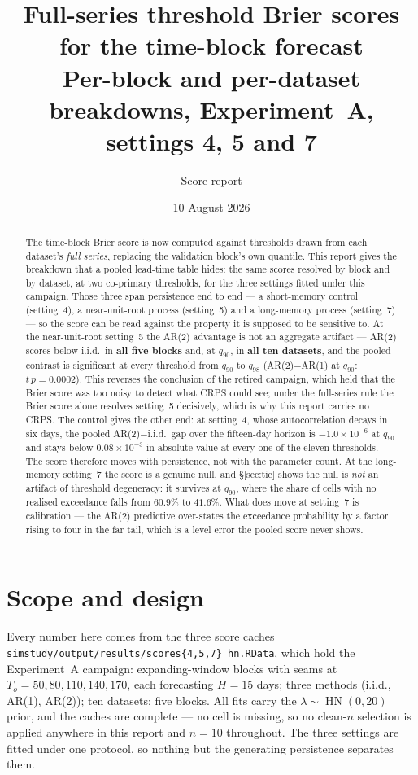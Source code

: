 \documentclass[11pt]{article}
\title{\textbf{Full-series threshold Brier scores for the time-block
forecast}\\[2pt]
\large Per-block and per-dataset breakdowns, Experiment~A, settings 4, 5
and 7}
\author{Score report}
\date{10 August 2026}
\newcommand{\code}[1]{\texttt{#1}}
\DeclareMathOperator{\hn}{HN}
\begin{document}
\maketitle

\begin{abstract}
The time-block Brier score is now computed against thresholds drawn from
each dataset's \emph{full series}, replacing the validation block's own
quantile. This report gives the breakdown that a pooled lead-time table
hides: the same scores resolved by block and by dataset, at two
co-primary thresholds, for the three settings fitted under this campaign.
Those three span persistence end to end --- a short-memory control
(setting~4), a near-unit-root process (setting~5) and a long-memory
process (setting~7) --- so the score can be read against the property it
is supposed to be sensitive to. At the near-unit-root setting~5 the AR(2)
advantage is not an aggregate artifact --- AR(2) scores below i.i.d.\ in
\textbf{all five blocks} and, at $q_{90}$, in \textbf{all ten datasets},
and the pooled contrast is significant at every threshold from $q_{90}$
to $q_{98}$ (AR(2)$-$AR(1) at $q_{90}$: $t\,p = 0.0002$). This reverses
the conclusion of the retired campaign, which held that the Brier score
was too noisy to detect what CRPS could see; under the full-series rule
the Brier score alone resolves setting~5 decisively, which is why this
report carries no CRPS. The control gives the other end: at setting~4,
whose autocorrelation decays in six days, the pooled AR(2)$-$i.i.d.\ gap
over the fifteen-day horizon is $-1.0 \times 10^{-6}$ at $q_{90}$ and
stays below $0.08 \times 10^{-3}$ in absolute value at every one of the
eleven thresholds. The score therefore moves with persistence, not with
the parameter count. At the long-memory setting~7 the score is a genuine
null, and \S\ref{sec:tie} shows the null is \emph{not} an artifact of
threshold degeneracy: it survives at $q_{90}$, where the share of cells
with no realised exceedance falls from $60.9\%$ to $41.6\%$. What does
move at setting~7 is calibration --- the AR(2) predictive over-states
the exceedance probability by a factor rising to four in the far tail,
which is a level error the pooled score never shows.
\end{abstract}

\section{Scope and design}

Every number here comes from the three score caches
\code{simstudy/output/results/scores\{4,5,7\}\_hn.RData}, which hold the
Experiment~A campaign: expanding-window blocks with seams at
$T_o = 50, 80, 110, 140, 170$, each forecasting $H = 15$ days; three
methods (i.i.d., AR(1), AR(2)); ten datasets; five blocks. All fits carry
the $\lambda \sim \hn(0, 20)$ prior, and the caches are complete --- no
cell is missing, so no clean-$n$ selection is applied anywhere in this
report and $n = 10$ throughout. The three settings are fitted under one
protocol, so nothing but the generating persistence separates them.
\end{document}
